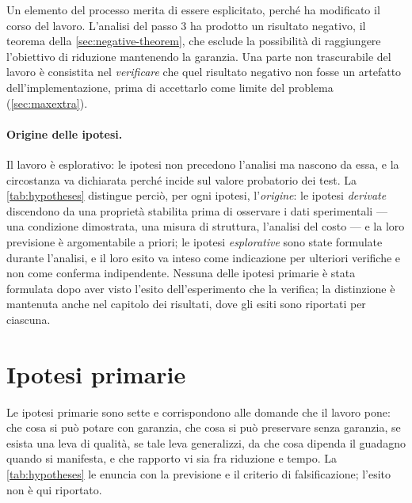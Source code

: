 Un elemento del processo merita di essere esplicitato, perché ha modificato il corso del lavoro.
L'analisi del passo 3 ha prodotto un risultato negativo, il teorema della
\autoref{sec:negative-theorem}, che esclude la possibilità di raggiungere l'obiettivo di
riduzione mantenendo la garanzia. Una parte non trascurabile del lavoro è consistita nel
\emph{verificare} che quel risultato negativo non fosse un artefatto
dell'implementazione, prima di accettarlo come limite del problema
(\autoref{sec:maxextra}).

\paragraph{Origine delle ipotesi.} Il lavoro è esplorativo: le ipotesi non precedono l'analisi ma
nascono da essa, e la circostanza va dichiarata perché incide sul valore probatorio dei test. La
\autoref{tab:hypotheses} distingue perciò, per ogni ipotesi, l'\emph{origine}: le ipotesi
\emph{derivate} discendono da una proprietà stabilita prima di osservare i dati sperimentali ---
una condizione dimostrata, una misura di struttura, l'analisi del costo --- e la loro previsione è
argomentabile a priori; le ipotesi \emph{esplorative} sono state formulate durante l'analisi, e il
loro esito va inteso come indicazione per ulteriori verifiche e non come conferma indipendente.
Nessuna delle ipotesi primarie è stata formulata dopo aver visto l'esito dell'esperimento che la
verifica; la distinzione è mantenuta anche nel capitolo dei risultati, dove gli esiti sono
riportati per ciascuna.

\section{Ipotesi primarie}\label{sec:hypotheses-list}

Le ipotesi primarie sono sette e corrispondono alle domande che il lavoro pone: che cosa si può
potare con garanzia, che cosa si può preservare senza garanzia, se esista una leva di qualità, se
tale leva generalizzi, da che cosa dipenda il guadagno quando si manifesta, e che rapporto vi sia
fra riduzione e tempo. La \autoref{tab:hypotheses} le enuncia con la previsione e il criterio di
falsificazione; l'esito non è qui riportato.

